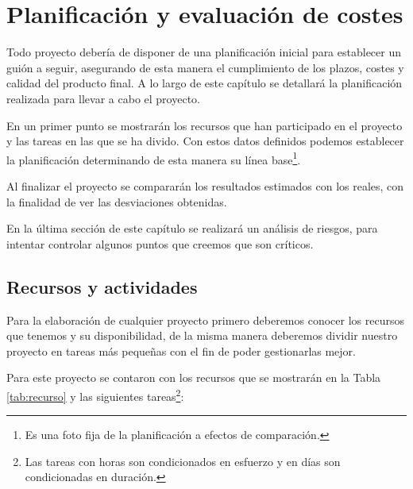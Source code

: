 \chapter{Planificación y evaluación de costes}
\label{chap:planificacion}


Todo proyecto debería de disponer de una planificación inicial para establecer un guión a seguir, asegurando de esta manera el cumplimiento de los plazos, costes y calidad del producto final. A lo largo de este capítulo se detallará la planificación realizada para llevar a cabo el proyecto. 

En un primer punto se mostrarán los recursos que han participado en el proyecto y las tareas en las que se ha divido. Con estos datos definidos podemos establecer la planificación determinando de esta manera su línea base\footnote{Es una foto fija de la planificación a efectos de comparación.}.

Al finalizar el proyecto se compararán los resultados estimados con los reales, con la finalidad de ver las  desviaciones obtenidas.

En la última sección de este capítulo se realizará un análisis de riesgos, para intentar controlar algunos puntos que creemos que son críticos.

\section{Recursos y actividades}

Para la elaboración de cualquier proyecto primero deberemos conocer los recursos que tenemos y su disponibilidad, de la misma manera deberemos dividir nuestro proyecto en tareas más pequeñas con el fin de poder gestionarlas mejor.

Para este proyecto se contaron con los recursos que se mostrarán en la Tabla \ref{tab:recurso} y las siguientes tareas\footnote{Las tareas con horas son condicionados en esfuerzo y en días son condicionadas en duración.}:


